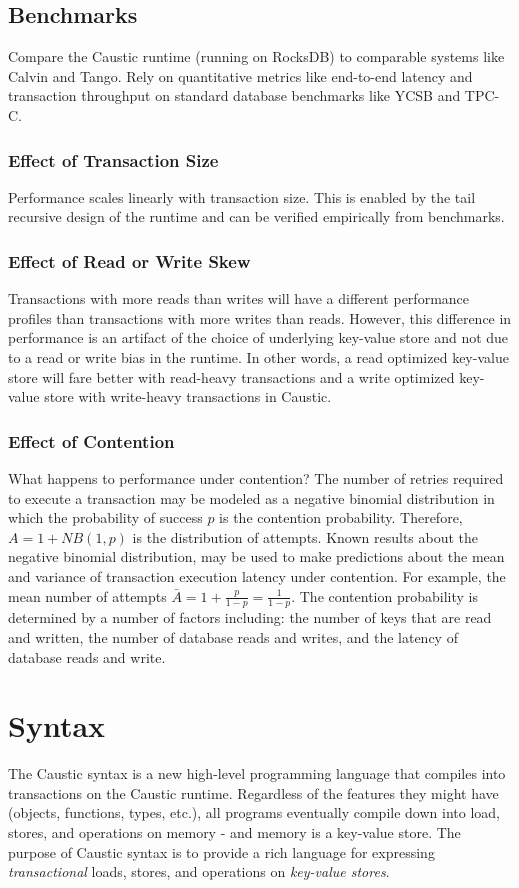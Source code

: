 \documentclass[12pt]{article}
\begin{document}
\subsection{Benchmarks}
Compare the Caustic runtime (running on RocksDB) to comparable systems like Calvin and Tango. Rely on quantitative metrics like end-to-end latency and transaction throughput on standard database benchmarks like YCSB and TPC-C.

\subsubsection{Effect of Transaction Size}
Performance scales linearly with transaction size. This is enabled by the tail recursive design of the runtime and can be verified empirically from benchmarks. 

\subsubsection{Effect of Read or Write Skew}
Transactions with more reads than writes will have a different performance profiles than transactions with more writes than reads. However, this difference in performance is an artifact of the choice of underlying key-value store and not due to a read or write bias in the runtime. In other words, a read optimized key-value store will fare better with read-heavy transactions and a write optimized key-value store with write-heavy transactions in Caustic.

\subsubsection{Effect of Contention}
What happens to performance under contention? The number of retries required to execute a transaction may be modeled as a negative binomial distribution in which the probability of success $p$ is the contention probability. Therefore, $A = 1 + NB(1, p)$ is the distribution of attempts. Known results about the negative binomial distribution, may be used to make predictions about the mean and variance of transaction execution latency under contention. For example, the mean number of attempts $\bar{A} = 1 + \frac{p}{1 - p} = \frac{1}{1 - p}$. The contention probability is determined by a number of factors including: the number of keys that are read and written, the number of database reads and writes, and the latency of database reads and write.

\section{Syntax}
The Caustic syntax is a new high-level programming language that compiles into transactions on the Caustic runtime. Regardless of the features they might have (objects, functions, types, etc.), all programs eventually compile down into load, stores, and operations on memory - and memory is a key-value store. The purpose of Caustic syntax is to provide a rich language for expressing \emph{transactional} loads, stores, and operations on \emph{key-value stores}.
\end{document}
